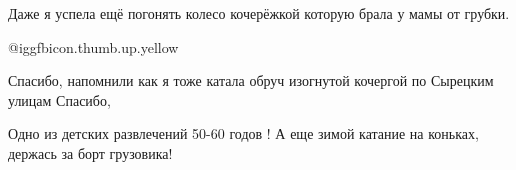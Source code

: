 \begin{itemize}
Даже я успела ещё погонять колесо кочерёжкой которую брала у мамы от грубки.

 @igg{fbicon.thumb.up.yellow} 


Спасибо, напомнили как я тоже катала обруч изогнутой кочергой по Сырецким
улицам Спасибо,


Одно из детских развлечений 50-60 годов ! А еще зимой катание на коньках,
держась за борт грузовика!

\end{itemize} %

